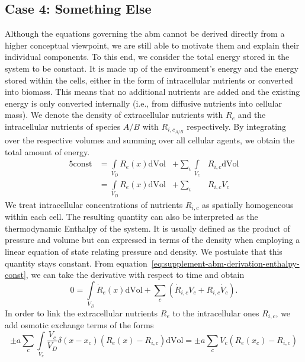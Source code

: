 \subsection{Case 4: Something Else}
Although the equations governing the \ac{abm} cannot be derived directly from a higher
conceptual viewpoint, we are still able to motivate them and explain their individual components.
To this end, we consider the total energy stored in the system to be constant.
It is made up of the environment's energy and the energy stored within the cells, either
in the form of intracellular nutrients or converted into biomass.
This means that no additional nutrients are added and the existing energy is only
converted internally (i.e., from diffusive nutrients into cellular mass).
We denote the density of extracellular nutrients with $R_e$ and the intracellular
nutrients of species $A/B$ with $R_{i,c_{A/B}}$ respectively.
By integrating over the respective volumes and summing over all cellular agents, we
obtain the total amount of energy.
\begin{alignat}{5}
    \text{const}
    &=\int\limits_{V_D} R_e(x) \text{dVol} &+ \sum\limits_\iota\int\limits_{V_c}&R_{i,c}\text{dVol}\\
    &=\int\limits_{V_D} R_e(x) \text{dVol} &+ \sum\limits_\iota&R_{i,c}V_c
    \label{eq:supplement-abm-derivation-enthalpy-const}
\end{alignat}
We treat intracellular concentrations of nutrients $R_{i,c}$ as spatially homogeneous
within each cell.
The resulting quantity can also be interpreted as the thermodynamic Enthalpy of the system.
It is usually defined as the product of pressure and volume but can expressed in terms of
the density when employing a linear equation of state relating pressure and density.
We postulate that this quantity stays constant.
From equation~\ref{eq:supplement-abm-derivation-enthalpy-const}, we can take the
derivative with respect to time and obtain
\begin{equation}
    0 =
    \int\limits_{V_D}\dot{R}_e(x)\text{dVol}
    + \sum\limits_c \left(\dot{R}_{i,c}V_c + R_{i,c}\dot{V}_c\right).
    \label{eq:supplement-abm-derivation-enthalpy-derivative}
\end{equation}
In order to link the extracellular nutrients $R_e$ to the intracellular ones $R_{i,c}$,
we add osmotic exchange terms of the forms
\begin{equation}
    \pm a
    \sum\limits_c\int\limits_{V_c}\frac{V_c}{V_D}\delta(x-x_c)(R_e(x)-R_{i,c})\text{dVol}
    = \pm a\sum\limits_c V_c (R_e(x_c)-R_{i,c})
    \label{eq:supplement-abm-derivation-osmotic-exchange-2}
\end{equation}
